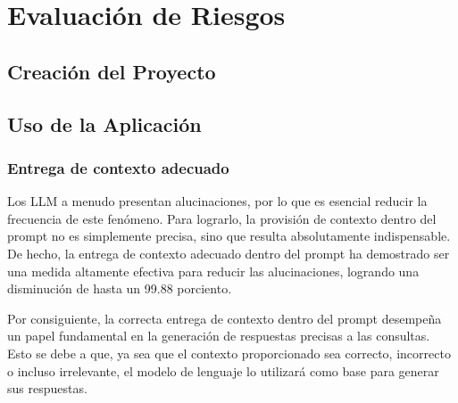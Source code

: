 
\chapter{Evaluación de Riesgos}

\section{Creación del Proyecto}
















\section{Uso de la Aplicación}

\subsection{Entrega de contexto adecuado}

Los LLM a menudo presentan alucinaciones, por lo que es esencial reducir la frecuencia de este fenómeno. 
Para lograrlo, la provisión de contexto dentro del prompt no es simplemente precisa, sino que resulta 
absolutamente indispensable. De hecho, la entrega de contexto adecuado dentro del prompt ha demostrado 
ser una medida altamente efectiva para reducir las alucinaciones, logrando una disminución de hasta un 
99.88 porciento. \cite{riego1}

Por consiguiente, la correcta entrega de contexto dentro del prompt desempeña un papel fundamental en 
la generación de respuestas precisas a las consultas. Esto se debe a que, ya sea que el contexto 
proporcionado sea correcto, incorrecto o incluso irrelevante, el modelo de lenguaje lo utilizará como base 
para generar sus respuestas.

